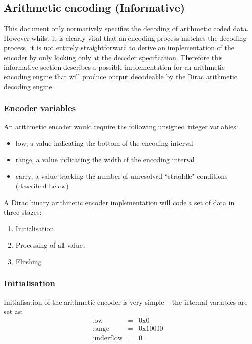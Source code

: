 \begin{informative*}
\subsection{Arithmetic encoding (Informative)}

This document only normatively specifies the decoding of arithmetic coded data. 
However whilst it is clearly vital that an encoding process matches the decoding
process, it is not entirely straightforward to derive an implementation of the
encoder by only looking only at the decoder specification. Therefore this
informative section describes a possible implementation for an
arithmetic encoding engine that will produce output decodeable by
the Dirac arithmetic decoding engine.

\subsubsection{Encoder variables}

An arithmetic encoder would require the following unsigned integer variables:
\begin{itemize}
\item $\text{low}$, a value indicating the bottom of the encoding interval
\item $\text{range}$, a value indicating the width of the encoding interval
\item $\text{carry}$, a value tracking the number of unresolved ``straddle" conditions 
(described below)
\end{itemize}

A Dirac binary arithmetic encoder implementation will code a set of data in three stages:
\begin{enumerate}
\item Initialisation
\item Processing of all values
\item Flushing
\end{enumerate}

\subsubsection{Initialisation}

Initialisation of the arithmetic encoder is very simple -- the internal variables are
set as:
\begin{eqnarray*}
\text{low}&=&\text{0x0} \\
\text{range}&=&\text{0x10000} \\
\text{underflow}&=&0
\end{eqnarray*}


\end{informative*}
